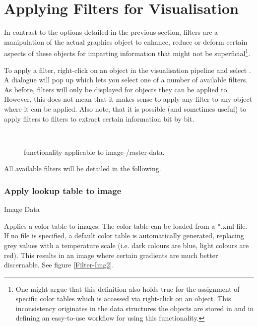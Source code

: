 \section{Applying Filters for Visualisation}
\label{filters}

In contrast to the options detailed in the previous section, filters are a manipulation of the actual graphics object to enhance, reduce or deform certain aspects of these objects for imparting information that might not be superficial\footnote{One might argue that this definition also holds true for the assignment of specific color tables which is accessed via right-click on an object. This inconsistency originates in the data structures the objects are stored in and in defining an easy-to-use workflow for using this functionality.}.

To apply a filter, right-click on an object in the visualisation pipeline and select . A dialogue will pop up which lets you select one of a number of available filters. As before, filters will only be displayed for objects they can be applied to. However, this does not mean that it makes sense to apply any filter to any object where it can be applied. Also note, that it is possible (and sometimes useful) to apply filters to filters to extract certain information bit by bit.
%
\begin{figure}[tb]
\begin{center}
\enspace
{} \\
\enspace
{}
\end{center}
\caption{\ogs functionality applicable to image-/raster-data.} \label{fig:filter:raster}
\end{figure}
%
All available filters will be detailed in the following.

\subsubsection{Apply lookup table to image}
 Image Data

 Applies a color table to images. The color table can be loaded from a *.xml-file. If no file is specified, a default color table is automatically generated, replacing grey values with a temperature scale (i.e. dark colours are blue, light colours are red). This results in an image where certain gradients are much better discernable. See figure \ref{Filter-Img2}.

